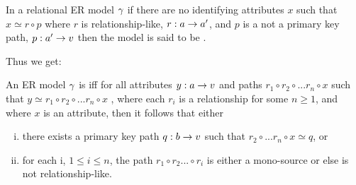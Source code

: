 In a relational ER model $\gamma$ if there are no identifying attributes $x$ such that $x \simeq r \circ p$ where $r$ is relationship-like, $r:a \rightarrow a'$, and $p$ is a not a primary key path, $p:a' \rightarrow v$ then the model is said to be .

Thus we get:

\begin{definition} 
An ER model $\gamma$ is 
iff for all attributes $y:a \rightarrow v$ and paths $r_1 \circ r_2 \circ ... r_n \circ x$
such that $y \simeq r_1 \circ r_2 \circ ... r_n \circ x$ ,  where each $r_i$ is a relationship for some $n \geq 1$, and where $x$ is an attribute, then
it follows that either
\begin{enumerate} [(i)]
\item there exists a primary key path $q:b \rightarrow v$ such that $r_2 \circ ... r_n \circ x \simeq q$, or
\item for each i, $1 \leq i \leq n$, the path $r_1 \circ r_2 ... \circ r_i$ is either a mono-source or else is not relationship-like.
\end{enumerate}
\end{definition}

